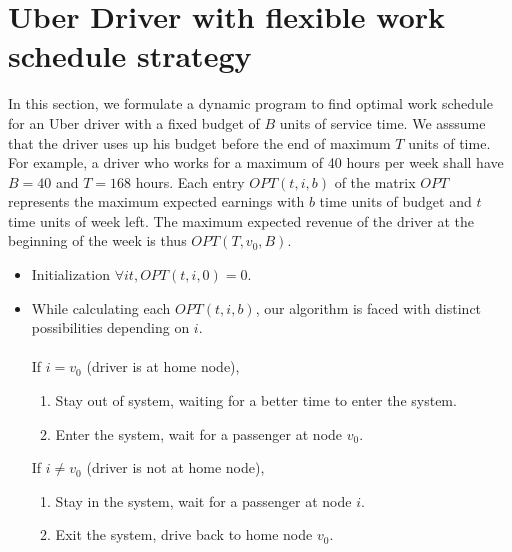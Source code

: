 \section{Uber Driver with flexible work schedule strategy}

In this section, we formulate a dynamic program to find optimal work schedule for an Uber driver with a fixed budget of $B$ units of service time. We asssume that the driver uses up his budget before the end of maximum $T$ units of time. For example, a driver who works for a maximum of 40 hours per week shall have $B=40$ and $T=168$ hours. Each entry $OPT(t, i, b)$ of the matrix $OPT$ represents the maximum expected earnings with $b$ time units of budget and $t$ time units of week left. The maximum expected revenue of the driver at the beginning of the week is thus $OPT(T, v_0, B)$.
\begin{itemize}
\item Initialization
        $\forall it, OPT(t, i, 0)=0$.
        
\item While calculating each $OPT(t, i, b)$, our algorithm is faced with distinct possibilities depending on $i$. \\ \\
If $i=v_0$ (driver is at home node),
    \begin{enumerate}
    \item Stay out of system, waiting for a better time to enter the system.
    \item Enter the system, wait for a passenger at node $v_0$.
    \end{enumerate}
If $i \neq v_0$ (driver is not at home node),
    \begin{enumerate}
    \item Stay in the system, wait for a passenger at node $i$.
    \item Exit the system, drive back to home node $v_0$.
    \end{enumerate}
    

\end{itemize}
